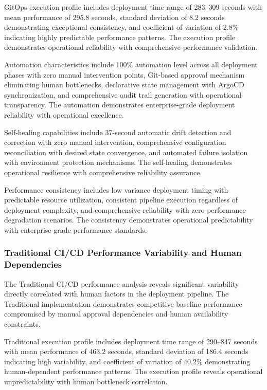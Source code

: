 GitOps execution profile includes deployment time range of 283--309 seconds with mean performance of 295.8 seconds, standard deviation of 8.2 seconds demonstrating exceptional consistency, and coefficient of variation of 2.8\% indicating highly predictable performance patterns. The execution profile demonstrates operational reliability with comprehensive performance validation.

Automation characteristics include 100\% automation level across all deployment phases with zero manual intervention points, Git-based approval mechanism eliminating human bottlenecks, declarative state management with ArgoCD synchronization, and comprehensive audit trail generation with operational transparency. The automation demonstrates enterprise-grade deployment reliability with operational excellence.

Self-healing capabilities include 37-second automatic drift detection and correction with zero manual intervention, comprehensive configuration reconciliation with desired state convergence, and automated failure isolation with environment protection mechanisms. The self-healing demonstrates operational resilience with comprehensive reliability assurance.

Performance consistency includes low variance deployment timing with predictable resource utilization, consistent pipeline execution regardless of deployment complexity, and comprehensive reliability with zero performance degradation scenarios. The consistency demonstrates operational predictability with enterprise-grade performance standards.

\subsubsection{Traditional CI/CD Performance Variability and Human Dependencies}

The Traditional CI/CD performance analysis reveals significant variability directly correlated with human factors in the deployment pipeline. The Traditional implementation demonstrates competitive baseline performance compromised by manual approval dependencies and human availability constraints.

Traditional execution profile includes deployment time range of 290--847 seconds with mean performance of 463.2 seconds, standard deviation of 186.4 seconds indicating high variability, and coefficient of variation of 40.2\% demonstrating human-dependent performance patterns. The execution profile reveals operational unpredictability with human bottleneck correlation.

